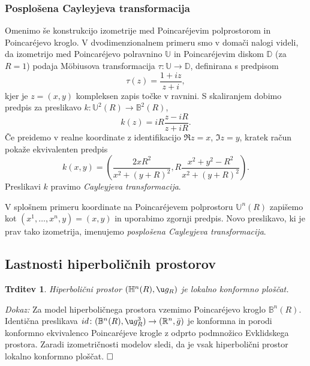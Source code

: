 \documentclass[a4paper]{article}
\newtheorem{trditev}{Trditev}
\def\qed{$\hfill\Box$}   %
\begin{document}
\subsubsection{Posplošena Cayleyjeva transformacija}
Omenimo še konstrukcijo izometrije med Poincar\'ejevim polprostorom in Poincar\'ejevo kroglo. 
V dvodimenzionalnem primeru smo v domači nalogi videli, da izometrijo med Poincar\'ejevo polravnino $\mathbb{U}$ in Poincar\'ejevim diskom $\mathbb{D}$ (za $R=1$) podaja M\"obiusova transformacija $\tau \colon \mathbb{U} \to \mathbb{D}$, definirana s predpisom
\begin{equation}
\tau(z) = \frac{1+iz}{z+i},
\end{equation} 
kjer je $z=(x,y)$ kompleksen zapis točke v ravnini. S skaliranjem dobimo predpis za preslikavo $k \colon \mathbb{U}^{2}(R) \to \mathbb{B}^{2}(R)$,
\begin{equation}
k(z) = iR \frac{z-iR}{z+iR}.
\end{equation} 
Če preidemo v realne koordinate z identifikacijo $\Re{z}=x$, $\Im{z}=y$, kratek račun pokaže ekvivalenten predpis
\begin{equation}
k(x,y) = \left( \frac{2xR^2}{x^2+(y+R)^2}, R \frac{x^2+y^2-R^2}{x^2+(y+R)^2} \right).
\end{equation}
Preslikavi $k$ pravimo \emph{Cayleyjeva transformacija}.

V splošnem primeru koordinate na Poincar\'ejevem polprostoru $\mathbb{U}^{n}(R)$ zapišemo kot $(x^{1}, \dots , x^{n}, y) = (x,y)$ in uporabimo zgornji predpis. Novo preslikavo, ki je prav tako izometrija, imenujemo \emph{posplošena Cayleyjeva transformacija}.

\subsection{Lastnosti hiperboličnih prostorov}

\begin{trditev}
Hiperbolični prostor $(\mathbb{H}^{n}(R), \u g_{R})$ je lokalno konformno ploščat.
\end{trditev}

\noindent
{\em Dokaz:\/} 
Za model hiperboličnega prostora vzemimo Poincar\'ejevo kroglo  $\mathbb{B}^{n}(R)$. Identična preslikava $id \colon (\mathbb{B}^{n}(R), \u g_{R}^{3}) \to (\mathbb{R}^{n}, \bar{g})$ je konformna in porodi konformno ekvivalenco Poincar\'ejeve krogle z odprto podmnožico Evklidskega prostora. Zaradi izometričnosti modelov sledi, da je vsak hiperbolični prostor lokalno konformno ploščat.
\qed
\end{document}
